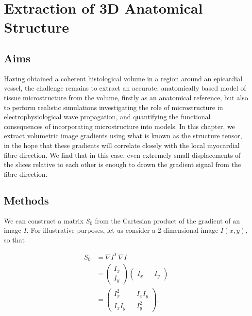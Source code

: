 \chapter{Extraction of 3D Anatomical Structure} %
\label{cha:extraction_of_3d_anatomical_structure}

\dblspace
\begin{quote}{\em }\end{quote}

\section{Aims} %
\label{sec:aims}
  Having obtained a coherent histological volume in a region around an epicardial vessel, the challenge remains to extract an accurate, anatomically based model of tissue microstructure from the volume, firstly as an anatomical reference, but also to perform realistic simulations investigating the role of microstructure in electrophysiological wave propagation, and quantifying the functional consequences of incorporating microstructure into models. In this chapter, we extract volumetric image gradients using what is known as the structure tensor, in the hope that these gradients will correlate closely with the local myocardial fibre direction. We find that in this case, even extremely small displacements of the slices relative to each other is enough to drown the gradient signal from the fibre direction.

\section{Methods} %
\label{sec:methods}
  We can construct a matrix $S_0$ from the Cartesian product of the gradient of an image $I$. For illustrative purposes, let us consider a 2-dimensional image $I(x,y)$, so that
  
  \begin{align}
    S_0 &= \nabla I^T \, \nabla I \\
        &= \begin{pmatrix}
      I_x \\
      I_y
    \end{pmatrix} \begin{pmatrix}
      I_x && I_y
    \end{pmatrix} \\
        &= \begin{pmatrix}
          I_x^2 && I_xI_y \\
          I_xI_y && I_y^2
        \end{pmatrix}.
  \end{align}
  
